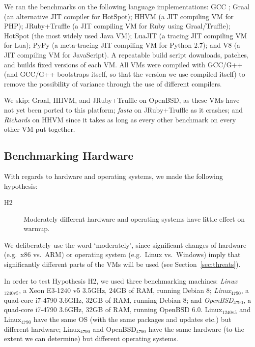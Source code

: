 \documentclass[acmlarge]{acmart}\settopmatter{printfolios=true}
\newcommand{\hyptwo}{H2\xspace}
\newcommand{\richards}{\emph{Richards}\xspace}
\newcommand{\fasta}{\emph{fasta}\xspace}
\newcommand{\bencherfive}{Linux$_\mathrm{4790}$\xspace}
\newcommand{\benchersix}{OpenBSD$_\mathrm{4790}$\xspace}
\newcommand{\bencherseven}{Linux$_\mathrm{1240v5}$\xspace}
\begin{document}
We ran the benchmarks on the following language implementations: GCC \gccversion;
Graal \graalversion (an alternative JIT compiler for HotSpot); HHVM \hhvmversion (a JIT
compiling VM for PHP); JRuby+Truffle \jrubytruffleversion{} (a JIT compiling VM
for Ruby using Graal/Truffle);
HotSpot \hotspotversion (the most widely used Java
VM); LuaJIT \luajitversion (a tracing JIT compiling VM for Lua); PyPy \pypyversion (a
meta-tracing JIT compiling VM for Python 2.7); and V8 \veightversion (a JIT
compiling VM for JavaScript). A repeatable build script downloads, patches,
and builds fixed versions of each VM. All VMs were compiled with GCC/G++ \gccversion
(and GCC/G++ bootstraps itself, so that the version we use compiled itself)
to remove the possibility of variance through the use of different compilers.

\label{openbsd porting} We skip: Graal, HHVM, and JRuby+Truffle on OpenBSD, as
these VMs have not yet been ported to this platform; \fasta on JRuby+Truffle as
it crashes; and \richards on HHVM since it takes as long as every other benchmark
on every other VM put together.


\subsection{Benchmarking Hardware}

With regards to hardware and operating systems, we made the
following hypothesis:
\begin{description}
  \item[\hyptwo] Moderately different hardware and operating systems have little effect on warmup.
\end{description}
We deliberately use the word `moderately', since significant changes of hardware
(e.g.~x86 vs.~ARM) or operating system (e.g.~Linux vs.~Windows) imply that
significantly different parts of the VMs will be used (see Section~\ref{sec:threats}).

In order to test Hypothesis \hyptwo, we used three benchmarking machines: \emph{\bencherseven}, a Xeon E3-1240 v5 3.5GHz,
24GB of RAM, running Debian 8; \emph{\bencherfive}, a quad-core i7-4790
3.6GHz, 32GB of RAM, running Debian 8; and \emph{\benchersix}, a quad-core i7-4790
3.6GHz, 32GB of RAM, running OpenBSD 6.0. \bencherseven and \bencherfive
have the same OS (with the same packages and updates etc.) but different hardware; \bencherfive
and \benchersix have the same hardware (to the extent we can determine)
but different operating systems.
\end{document}
